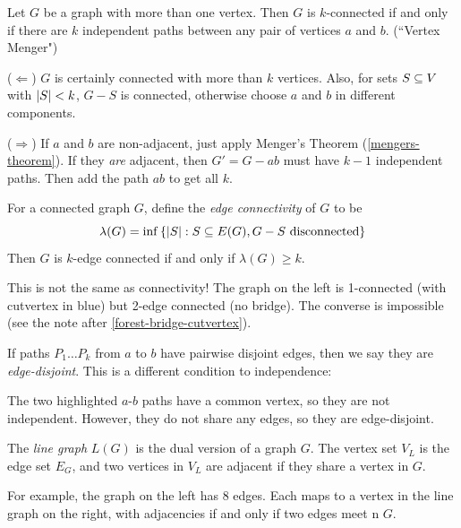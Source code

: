 \documentclass{article}
\begin{document}
\begin{corollary}
    Let $G$ be a graph with more than one vertex. Then $G$ is $k$-connected if and only if there are $k$ independent paths between any pair of vertices $a$ and $b$. (``Vertex Menger")
\end{corollary}

\begin{prf}
    ($\Leftarrow$) $G$ is certainly connected with more than $k$ vertices. Also, for sets $S \subseteq V$ with $\left\lvert S \right\rvert < k$, $G-S$ is connected, otherwise choose $a$ and $b$ in different components.
    
    ($\Rightarrow$) If $a$ and $b$ are non-adjacent, just apply Menger's Theorem (\ref{mengers-theorem}). If they \textit{are} adjacent, then $G' = G - ab$ must have $k-1$ independent paths. Then add the path $ab$ to get all $k$.
\end{prf}

\begin{definition}
    For a connected graph $G$, define the \textit{edge connectivity} of $G$ to be
    \[
	\lambda(G) = \inf \left\lbrace \left\lvert S \right\rvert: S \subseteq E(G), G-S \text{ disconnected} \right\rbrace
	\]
	Then $G$ is $k$-edge connected if and only if $\lambda(G) \geq k$.
\end{definition}

\begin{note}
	This is not the same as connectivity! The graph on the left is 1-connected (with cutvertex in blue) but 2-edge connected (no bridge). The converse is impossible (see the note after \ref{forest-bridge-cutvertex}).
\end{note}
	

\begin{definition}
    If paths $P_1 \dots P_k$ from $a$ to $b$ have pairwise disjoint edges, then we say they are \textit{edge-disjoint}. This is a different condition to independence:
    
    The two highlighted $a$-$b$ paths have a common vertex, so they are not independent. However, they do not share any edges, so they are edge-disjoint.
\end{definition}

\begin{definition}
    \label{line-graph-definition}
    The \textit{line graph} $L(G)$ is the dual version of a graph $G$. The vertex set $V_L$ is the edge set $E_G$, and two vertices in $V_L$ are adjacent if they share a vertex in $G$.
    
    For example, the graph on the left has 8 edges. Each maps to a vertex in the line graph on the right, with adjacencies if and only if two edges meet n $G$.
\end{definition}
\end{document}
